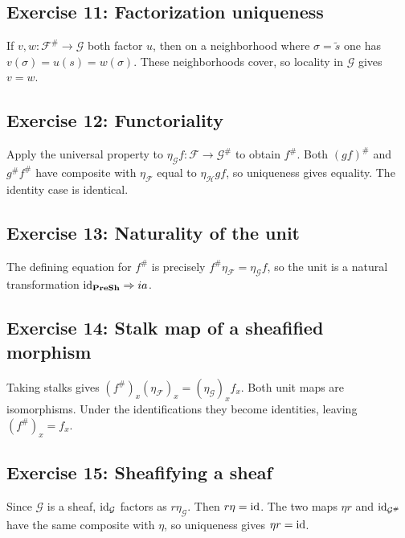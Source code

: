 \subsection*{Exercise 11: Factorization uniqueness}
\begin{solution}
If $v,w:\mathcal F^\#\to\mathcal G$ both factor $u$, then on a neighborhood where $\sigma=\widetilde s$ one has $v(\sigma)=u(s)=w(\sigma)$.  These neighborhoods cover, so locality in $\mathcal G$ gives $v=w$.
\end{solution}

\subsection*{Exercise 12: Functoriality}
\begin{solution}
Apply the universal property to $\eta_\mathcal G f:\mathcal F\to\mathcal G^\#$ to obtain $f^\#$.  Both $(gf)^\#$ and $g^\#f^\#$ have composite with $\eta_\mathcal F$ equal to $\eta_\mathcal H gf$, so uniqueness gives equality.  The identity case is identical.
\end{solution}

\subsection*{Exercise 13: Naturality of the unit}
\begin{solution}
The defining equation for $f^\#$ is precisely $f^\#\eta_\mathcal F=\eta_\mathcal Gf$, so the unit is a natural transformation $\operatorname{id}_{\mathbf{PreSh}}\Rightarrow i a$.
\end{solution}

\subsection*{Exercise 14: Stalk map of a sheafified morphism}
\begin{solution}
Taking stalks gives $(f^\#)_x(\eta_\mathcal F)_x=(\eta_\mathcal G)_x f_x$.  Both unit maps are isomorphisms.  Under the identifications they become identities, leaving $(f^\#)_x=f_x$.
\end{solution}

\subsection*{Exercise 15: Sheafifying a sheaf}
\begin{solution}
Since $\mathcal G$ is a sheaf, $\operatorname{id}_\mathcal G$ factors as $r\eta_\mathcal G$.  Then $r\eta=\operatorname{id}$.  The two maps $\eta r$ and $\operatorname{id}_{\mathcal G^\#}$ have the same composite with $\eta$, so uniqueness gives $\eta r=\operatorname{id}$.
\end{solution}

